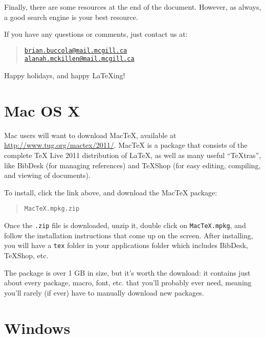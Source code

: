 \documentclass{article}
\begin{document}
Finally, there are some resources at the end of the document. However, as
always, a good search engine is your best resource.

If you have any questions or comments, just contact us at:

\begin{quote}
\href{mailto:brian.buccola@mail.mcgill.ca}{\tt brian.buccola@mail.mcgill.ca} \\
\href{mailto:alanah.mckillen@mail.mcgill.ca}{\tt alanah.mckillen@mail.mcgill.ca}
\end{quote}

Happy holidays, and happy \LaTeX{}ing!


\section{Mac OS X}

Mac users will want to download Mac\TeX{}, available at
\url{http://www.tug.org/mactex/2011/}. Mac\TeX{} is a package that consists of
the complete \TeX{} Live 2011 distribution of \LaTeX{}, as well as many useful
``\TeX{}tras'', like BibDesk (for managing references) and \TeX{}Shop (for easy
editing, compiling, and viewing of documents).

To install, click the link above, and download the Mac\TeX{} package:

\begin{quote}
\begin{verbatim}
MacTeX.mpkg.zip
\end{verbatim}
\end{quote}

Once the \texttt{.zip} file is downloaded, unzip it, double click on
\texttt{MacTeX.mpkg}, and follow the installation instructions that come up on
the screen. After installing, you will have a \texttt{tex} folder in your
applications folder which includes BibDesk, \TeX{}Shop, etc.

The package is over 1 GB in size, but it's worth the download: it contains just
about every package, macro, font, etc. that you'll probably ever need, meaning
you'll rarely (if ever) have to manually download new packages.


\section{Windows}
\end{document}
